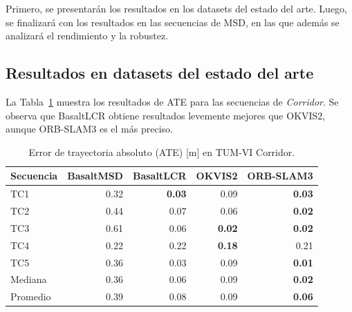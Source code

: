 Primero, se presentarán los resultados en los datasets del estado del arte. Luego, se finalizará con los resultados en las secuencias de MSD, en las que además se analizará el rendimiento y la robustez.

\subsection{Resultados en datasets del estado del arte}

La Tabla~\ref{tab:corridor_sota_ate} muestra los resultados de ATE para las secuencias de \textit{Corridor}. Se observa que BasaltLCR obtiene resultados levemente mejores que OKVIS2, aunque ORB-SLAM3 es el más preciso.
%
\begin{table}[!htbp]
\centering
\caption{Error de trayectoria absoluto (ATE) [m] en TUM-VI Corridor.}
\label{tab:corridor_sota_ate}
\begin{tabular}{lrrrr}
\toprule
\textbf{Secuencia} & \textbf{BasaltMSD} & \textbf{BasaltLCR} & \textbf{OKVIS2} & \textbf{ORB-SLAM3} \\
\midrule
TC1 & 0.32 & \textbf{0.03} & 0.09 & \textbf{0.03} \\
TC2 & 0.44 & 0.07 & 0.06 & \textbf{0.02} \\
TC3 & 0.61 & 0.06 & \textbf{0.02} & \textbf{0.02} \\
TC4 & 0.22 & 0.22 & \textbf{0.18} & 0.21 \\
TC5 & 0.36 & 0.03 & 0.09 & \textbf{0.01} \\
\midrule
Mediana & 0.36 & 0.06 & 0.09 & \textbf{0.02} \\
Promedio & 0.39 & 0.08 & 0.09 & \textbf{0.06} \\
\bottomrule
\end{tabular}
\end{table}

